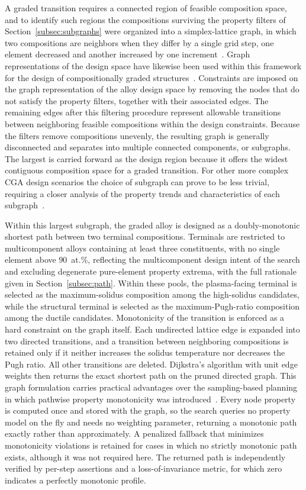 A graded transition requires a connected region of feasible composition
space, and to identify such regions the compositions surviving the property
filters of Section~\ref{subsec:subgraphs} were organized into a
simplex-lattice graph, in which two
compositions are neighbors when they differ by a single grid step, one
element decreased and another increased by one increment~\cite{nimplex}.
Graph representations of the design space have likewise been used within
this framework for the design of compositionally graded
structures~\cite{multiterminalCGA2024}. Constraints are imposed on the graph
representation of the alloy design space by removing the nodes that do not
satisfy the property filters, together with their associated edges. The remaining edges after this filtering procedure
represent allowable transitions between neighboring feasible compositions
within the design constraints. Because the filters remove compositions
unevenly, the resulting graph is generally disconnected and separates into
multiple connected components, or subgraphs. The largest is carried forward
as the design region because it offers the widest contiguous composition
space for a graded transition. For other more complex CGA design scenarios the
choice of subgraph can prove to be less trivial, requiring a closer analysis
of the property trends and characteristics of each
subgraph~\cite{obrist2026graph}.

Within this largest subgraph, the graded alloy is designed as a
doubly-monotonic shortest path between two terminal compositions. Terminals
are restricted to multicomponent alloys containing at least three
constituents, with no single element above \(90\)~at.\%, reflecting the
multicomponent design intent of the search and excluding degenerate
pure-element property extrema, with the full rationale given in
Section~\ref{subsec:path}. Within these pools, the plasma-facing terminal is selected as the
maximum-solidus composition among the high-solidus candidates, while the
structural terminal is selected as the maximum-Pugh-ratio composition among
the ductile candidates. Monotonicity of the transition is enforced as a hard constraint
on the graph itself. Each undirected lattice edge is expanded into two directed
transitions, and a transition between neighboring compositions is retained
only if it neither increases the solidus temperature nor decreases the Pugh
ratio. All other transitions are deleted. Dijkstra's algorithm with unit edge weights then returns the exact
shortest path on the pruned directed graph.
This graph formulation carries practical advantages over the
sampling-based planning in which pathwise property monotonicity was
introduced~\cite{kirk2021monotonic}. Every node property is computed once
and stored with the graph, so the search queries no property model on the
fly and needs no weighting parameter, returning a monotonic path
exactly rather than approximately.
A penalized fallback that minimizes monotonicity violations is retained for cases in which no strictly monotonic path exists, although it was not required here. The returned path is independently verified by per-step assertions and a loss-of-invariance metric, for which zero indicates a perfectly monotonic profile.